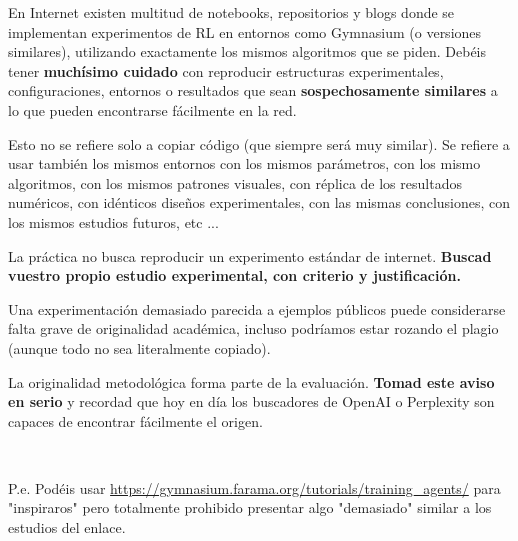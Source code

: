 \documentclass[a4paper, 11pt]{article}
\begin{document}
\begin{alertbox}
En Internet existen multitud de notebooks, repositorios y blogs donde se implementan experimentos de RL en entornos como Gymnasium (o versiones similares), utilizando exactamente los mismos algoritmos que se piden. 
Debéis tener \textbf{muchísimo cuidado} con reproducir estructuras experimentales, configuraciones, entornos o resultados que sean \textbf{sospechosamente similares} a lo que pueden encontrarse fácilmente en la red.

Esto no se refiere solo a copiar código (que siempre será muy similar). Se refiere a usar también los mismos entornos con los mismos parámetros, con los mismo algoritmos, con los mismos patrones visuales, con réplica de los resultados numéricos, con idénticos diseños experimentales, con las mismas conclusiones, con los mismos estudios futuros, etc ...

La práctica no busca reproducir un experimento estándar de internet. \textbf{Buscad  vuestro propio estudio experimental, con criterio y justificación.}

Una experimentación demasiado parecida a ejemplos públicos puede considerarse falta grave de originalidad académica, incluso  podríamos estar rozando el plagio (aunque todo no sea literalmente copiado).

La originalidad metodológica forma parte de la evaluación. \textbf{Tomad este aviso en serio} y recordad que hoy en día los buscadores de OpenAI o Perplexity son capaces de encontrar fácilmente el origen.

~

P.e. Podéis usar \url{https://gymnasium.farama.org/tutorials/training_agents/} para "{}inspiraros"{} pero totalmente prohibido presentar algo "demasiado"{} similar a los estudios del enlace.
\end{alertbox}
\end{document}
